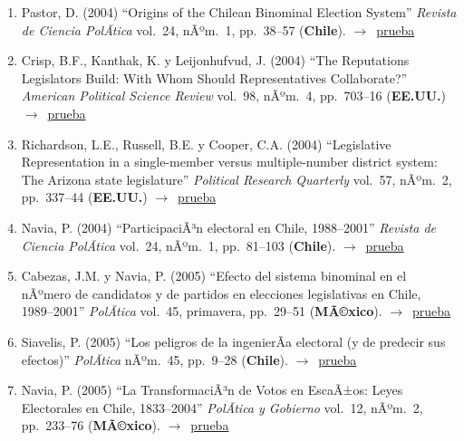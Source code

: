 \documentclass[12 pt, letter]{article}
\newenvironment{CitasMiTrabajo}{
    \begin{footnotesize}
    \begin{enumerate}[label={\footnotesize\emph{cita~\arabic*}},ref=\arabic*] %
        \setlength{\itemsep}{.1\itemsep}
        \setlength{\parskip}{.1\parskip}
    }{\end{enumerate}\end{footnotesize}}
\begin{document}
\begin{CitasMiTrabajo}
        \item Pastor, D. (2004)
        ``Origins of the Chilean Binominal Election System''
        \emph{Revista de Ciencia PolÃ­tica} vol.\ 24, nÃºm.\ 1, pp.\ 38--57
        (\textbf{Chile}). $\rightarrow$~\href{http://ericmagar.com/cv/cites/mrs/pastor2004rcp.pdf}{prueba}

        \item Crisp, B.F., Kanthak, K. y Leijonhufvud, J. (2004)
        ``The Reputations Legislators Build: With Whom Should Representatives Collaborate?''
        \emph{American Political Science Review} vol.\ 98, nÃºm.\ 4, pp.\ 703--16  (\textbf{EE.UU.}) $\rightarrow$~\href{http://ericmagar.com/cv/cites/mrs/crispEtAl.pdf}{prueba}

        \item Richardson, L.E., Russell, B.E. y Cooper, C.A. (2004)
        ``Legislative
        Representation in a single-member versus multiple-number district system:
        The Arizona state legislature'' \emph{Political Research Quarterly} vol.\ 57, nÃºm.\ 2,
        pp.\ 337--44 (\textbf{EE.UU.}) $\rightarrow$~\href{http://ericmagar.com/cv/cites/mrs/richEtal.pdf}{prueba}

        \item Navia, P. (2004)
        ``ParticipaciÃ³n electoral en Chile, 1988--2001''
        \emph{Revista de Ciencia PolÃ­tica} vol.\ 24, nÃºm.\ 1, pp.\ 81--103 (\textbf{Chile}). $\rightarrow$~\href{http://ericmagar.com/cv/cites/mrs/navia2004rcp.pdf}{prueba}

        \item Cabezas, J.M. y Navia, P. (2005)
        ``Efecto del sistema binominal en el nÃºmero de candidatos y de partidos en elecciones legislativas en Chile, 1989--2001''
        \emph{PolÃ­tica} vol.\ 45, primavera, pp.\ 29--51  (\textbf{MÃ©xico}). $\rightarrow$~\href{http://ericmagar.com/cv/cites/mrs/cabezas.naviaNcandBinomial2005.pdf}{prueba}

        \item Siavelis, P. (2005)
        ``Los peligros de la ingenierÃ­a electoral (y de predecir sus efectos)''
        \emph{PolÃ­tica} nÃºm.\ 45, pp.\ 9--28  (\textbf{Chile}). $\rightarrow$~\href{http://ericmagar.com/cv/cites/mrs/siavelis2005politica.pdf}{prueba}

        \item Navia, P. (2005)
        ``La TransformaciÃ³n de Votos en EscaÃ±os: Leyes Electorales en Chile, 1833--2004''
        \emph{PolÃ­tica y Gobierno} vol.\ 12, nÃºm.\ 2, pp.\ 233--76  (\textbf{MÃ©xico}). $\rightarrow$~\href{http://ericmagar.com/cv/cites/mrs/navia2005pyg.pdf}{prueba}


\end{CitasMiTrabajo}
\end{document}
